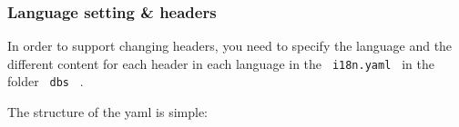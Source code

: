 \begin{Shaded}
\begin{Highlighting}[]
\KeywordTok{:}
\AttributeTok{  }\KeywordTok{:}\AttributeTok{ }\KeywordTok{[}\KeywordTok{]}
\AttributeTok{  }\KeywordTok{:}
\AttributeTok{    }\KeywordTok{:}
\AttributeTok{      }\KeywordTok{:}
\AttributeTok{      }\KeywordTok{:}\AttributeTok{ }
\AttributeTok{      }\KeywordTok{:}
\AttributeTok{      }\KeywordTok{:}
\AttributeTok{    }\KeywordTok{:}
\AttributeTok{      }\KeywordTok{:}
\AttributeTok{      }\KeywordTok{:}
\AttributeTok{      }\KeywordTok{:}
\AttributeTok{      }\KeywordTok{:}
\AttributeTok{    }\KeywordTok{:}
\AttributeTok{      }\KeywordTok{:}
\AttributeTok{      }\KeywordTok{:}
\AttributeTok{      }\KeywordTok{:}
\AttributeTok{      }\KeywordTok{:}
\AttributeTok{    }\KeywordTok{:}
\AttributeTok{      }\KeywordTok{:}\AttributeTok{ }
\AttributeTok{      }\KeywordTok{:}
\AttributeTok{      }\KeywordTok{:}
\AttributeTok{      }\KeywordTok{:}
\end{Highlighting}
\end{Shaded}

\subsubsection{Language setting \&
headers}\label{language-setting-headers}

In order to support changing headers, you need to specify the language
and the different content for each header in each language in the
\texttt{\ i18n.yaml\ } in the folder \texttt{\ dbs\ } .

The structure of the yaml is simple:


